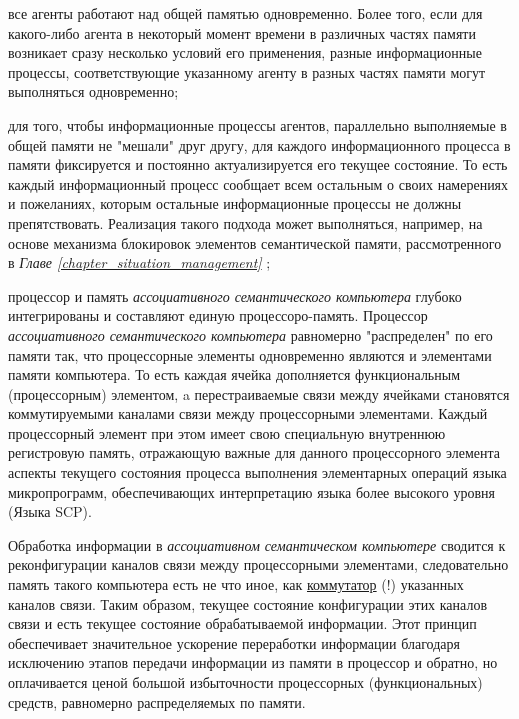 \begin{textitemize}
	\item все агенты работают над общей памятью одновременно. Более того, если для какого-либо агента в некоторый момент времени в различных частях памяти возникает сразу несколько условий его применения, разные информационные процессы, соответствующие указанному агенту в разных частях памяти могут выполняться одновременно;
	\item для того, чтобы информационные процессы агентов, параллельно выполняемые в общей памяти не "мешали"{} друг другу, для каждого информационного процесса в памяти фиксируется и постоянно актуализируется его текущее состояние. То есть каждый информационный процесс сообщает всем остальным о своих намерениях и пожеланиях, которым остальные информационные процессы не должны препятствовать. Реализация такого подхода может выполняться, например, на основе механизма блокировок элементов семантической памяти, рассмотренного в \textit{Главе \ref{chapter_situation_management} };
	\item процессор и память \textit{ассоциативного семантического компьютера} глубоко интегрированы и составляют единую процессоро-память. Процессор \textit{ассоциативного семантического компьютера} равномерно "распределен"{} по его памяти так, что процессорные элементы одновременно являются и элементами памяти компьютера. То есть каждая ячейка дополняется функциональным (процессорным) элементом, a перестраиваемые связи между ячейками становятся коммутируемыми каналами связи между процессорными элементами. Каждый процессорный элемент при этом имеет свою специальную внутреннюю регистровую память, отражающую важные для данного процессорного элемента аспекты текущего состояния процесса выполнения элементарных операций языка микропрограмм, обеспечивающих интерпретацию языка более высокого уровня (Языка SCP).
	
	Обработка информации в \textit{ассоциативном семантическом компьютере} сводится к реконфигурации каналов связи между процессорными элементами, следовательно память такого компьютера есть не что иное, как \uline{коммутатор} (!) указанных каналов связи. Таким образом, текущее состояние конфигурации этих каналов связи и есть текущее состояние обрабатываемой информации. Этот принцип обеспечивает значительное ускорение переработки информации благодаря исключению этапов передачи информации из памяти в процессор и обратно, но оплачивается ценой большой избыточности процессорных (функциональных) средств, равномерно распределяемых по памяти.
\end{textitemize}


